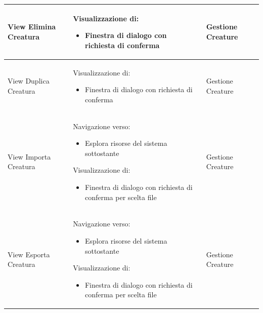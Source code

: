 \documentclass[a4paper, 11pt]{article}
\begin{document}
\begin{adjustwidth}{-1.5cm}{-1.5cm}
\begin{center}
\begin{longtable}{|p{5cm}|p{5cm}|p{5cm}|}
        View Elimina Creatura & Visualizzazione di:
        \begin{itemize}
            \item Finestra di dialogo con richiesta di conferma
        \end{itemize} & Gestione Creature \\ \hline
        
        View Duplica Creatura & Visualizzazione di:
        \begin{itemize}
            \item Finestra di dialogo con richiesta di conferma
        \end{itemize} & Gestione Creature \\ \hline
        
        View Importa Creatura & Navigazione verso:
        \begin{itemize}
            \item Esplora risorse del sistema sottostante
        \end{itemize}
        Visualizzazione di:
        \begin{itemize}
            \item Finestra di dialogo con richiesta di conferma per scelta file
        \end{itemize} & Gestione Creature \\ \hline
        
        View Esporta Creatura & Navigazione verso:
        \begin{itemize}
            \item Esplora risorse del sistema sottostante
        \end{itemize}
        Visualizzazione di:
        \begin{itemize}
            \item Finestra di dialogo con richiesta di conferma per scelta file
        \end{itemize} & Gestione Creature \\ \hline
        

\end{longtable}
\end{center}
\end{adjustwidth}
\end{document}
